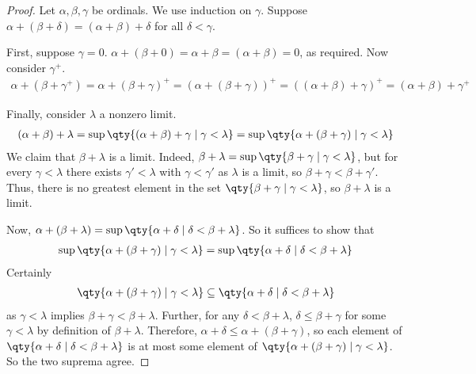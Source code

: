 \begin{proof}
    Let $\alpha, \beta, \gamma$ be ordinals.
    We use induction on $\gamma$.
    Suppose $\alpha + (\beta + \delta) = (\alpha + \beta) + \delta$ for all $\delta < \gamma$.

    First, suppose $\gamma = 0$.
    $\alpha + (\beta + 0) = \alpha + \beta = (\alpha + \beta) = 0$, as required.
    Now consider $\gamma^+$.
    \begin{align*}
       \alpha + (\beta + \gamma^+) = \alpha + (\beta + \gamma)^+ = (\alpha + (\beta + \gamma))^+ = ((\alpha + \beta) + \gamma)^+ = (\alpha + \beta) + \gamma^+
    \end{align*}

    Finally, consider $\lambda$ a nonzero limit.
    \begin{align*}
       (\alpha + \beta) + \lambda = \sup \qty{(\alpha + \beta) + \gamma \mid \gamma < \lambda} = \sup \qty{\alpha + (\beta + \gamma) \mid \gamma < \lambda}
    \end{align*}
    We claim that $\beta + \lambda$ is a limit.
    Indeed, $\beta + \lambda = \sup\qty{\beta + \gamma \mid \gamma < \lambda}$, but for every $\gamma < \lambda$ there exists $\gamma' < \lambda$ with $\gamma < \gamma'$ as $\lambda$ is a limit, so $\beta + \gamma < \beta + \gamma'$.
    Thus, there is no greatest element in the set $\qty{\beta + \gamma \mid \gamma < \lambda}$, so $\beta + \lambda$ is a limit.

    Now, $\alpha + (\beta + \lambda) = \sup\qty{\alpha + \delta \mid \delta < \beta + \lambda}$.
    So it suffices to show that
    \begin{align*}
       \sup\qty{\alpha + (\beta + \gamma) \mid \gamma < \lambda} = \sup\qty{\alpha + \delta \mid \delta < \beta + \lambda}
    \end{align*}
    Certainly
    \begin{align*}
       \qty{\alpha + (\beta + \gamma) \mid \gamma < \lambda} \subseteq \qty{\alpha + \delta \mid \delta < \beta + \lambda}
    \end{align*}
    as $\gamma < \lambda$ implies $\beta + \gamma < \beta + \lambda$.
    Further, for any $\delta < \beta + \lambda$, $\delta \leq \beta + \gamma$ for some $\gamma < \lambda$ by definition of $\beta + \lambda$.
    Therefore, $\alpha + \delta \leq \alpha + (\beta + \gamma)$, so each element of $\qty{\alpha + \delta \mid \delta < \beta + \lambda}$ is at most some element of $\qty{\alpha + (\beta + \gamma) \mid \gamma < \lambda}$.
    So the two suprema agree.
\end{proof}
